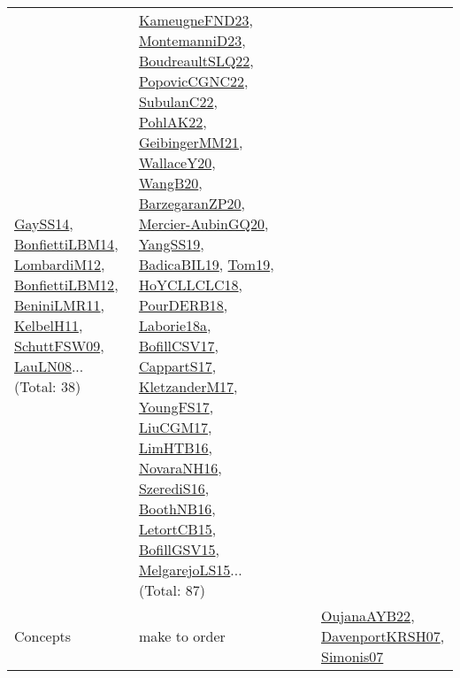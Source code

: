 {\begin{longtable}{lp{3cm}>{\raggedright}p{6cm}>{\raggedright}p{6cm}p{8cm}}
\href{papers/GaySS14.pdf}{GaySS14}\cite{GaySS14}, \href{articles/BonfiettiLBM14.pdf}{BonfiettiLBM14}\cite{BonfiettiLBM14}, \href{articles/LombardiM12.pdf}{LombardiM12}\cite{LombardiM12}, \href{papers/BonfiettiLBM12.pdf}{BonfiettiLBM12}\cite{BonfiettiLBM12}, \href{articles/BeniniLMR11.pdf}{BeniniLMR11}\cite{BeniniLMR11}, \href{articles/KelbelH11.pdf}{KelbelH11}\cite{KelbelH11}, \href{papers/SchuttFSW09.pdf}{SchuttFSW09}\cite{SchuttFSW09}, \href{papers/LauLN08.pdf}{LauLN08}\cite{LauLN08}... (Total: 38) & \href{papers/KameugneFND23.pdf}{KameugneFND23}\cite{KameugneFND23}, \href{articles/MontemanniD23.pdf}{MontemanniD23}\cite{MontemanniD23}, \href{papers/BoudreaultSLQ22.pdf}{BoudreaultSLQ22}\cite{BoudreaultSLQ22}, \href{papers/PopovicCGNC22.pdf}{PopovicCGNC22}\cite{PopovicCGNC22}, \href{articles/SubulanC22.pdf}{SubulanC22}\cite{SubulanC22}, \href{articles/PohlAK22.pdf}{PohlAK22}\cite{PohlAK22}, \href{papers/GeibingerMM21.pdf}{GeibingerMM21}\cite{GeibingerMM21}, \href{articles/WallaceY20.pdf}{WallaceY20}\cite{WallaceY20}, \href{papers/WangB20.pdf}{WangB20}\cite{WangB20}, \href{papers/BarzegaranZP20.pdf}{BarzegaranZP20}\cite{BarzegaranZP20}, \href{papers/Mercier-AubinGQ20.pdf}{Mercier-AubinGQ20}\cite{Mercier-AubinGQ20}, \href{papers/YangSS19.pdf}{YangSS19}\cite{YangSS19}, \href{papers/BadicaBIL19.pdf}{BadicaBIL19}\cite{BadicaBIL19}, \href{papers/Tom19.pdf}{Tom19}\cite{Tom19}, \href{papers/HoYCLLCLC18.pdf}{HoYCLLCLC18}\cite{HoYCLLCLC18}, \href{articles/PourDERB18.pdf}{PourDERB18}\cite{PourDERB18}, \href{papers/Laborie18a.pdf}{Laborie18a}\cite{Laborie18a}, \href{papers/BofillCSV17.pdf}{BofillCSV17}\cite{BofillCSV17}, \href{papers/CappartS17.pdf}{CappartS17}\cite{CappartS17}, \href{papers/KletzanderM17.pdf}{KletzanderM17}\cite{KletzanderM17}, \href{papers/YoungFS17.pdf}{YoungFS17}\cite{YoungFS17}, \href{papers/LiuCGM17.pdf}{LiuCGM17}\cite{LiuCGM17}, \href{papers/LimHTB16.pdf}{LimHTB16}\cite{LimHTB16}, \href{articles/NovaraNH16.pdf}{NovaraNH16}\cite{NovaraNH16}, \href{papers/SzerediS16.pdf}{SzerediS16}\cite{SzerediS16}, \href{papers/BoothNB16.pdf}{BoothNB16}\cite{BoothNB16}, \href{articles/LetortCB15.pdf}{LetortCB15}\cite{LetortCB15}, \href{papers/BofillGSV15.pdf}{BofillGSV15}\cite{BofillGSV15}, \href{papers/MelgarejoLS15.pdf}{MelgarejoLS15}\cite{MelgarejoLS15}... (Total: 87)\\
Concepts & make to order &  &  & \href{papers/OujanaAYB22.pdf}{OujanaAYB22}\cite{OujanaAYB22}, \href{papers/DavenportKRSH07.pdf}{DavenportKRSH07}\cite{DavenportKRSH07}, \href{articles/Simonis07.pdf}{Simonis07}\cite{Simonis07}\\

\end{longtable}}
